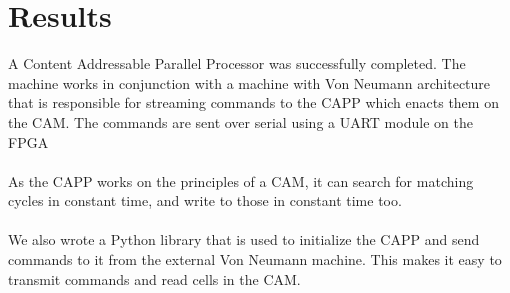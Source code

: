 \section{Results}
A Content Addressable Parallel Processor was successfully completed. 
The machine works in conjunction with a machine with Von Neumann architecture that is 
responsible for streaming commands to the CAPP which enacts them on the CAM. 
The commands are sent over serial using a UART module on the FPGA\\\\
As the CAPP works on the principles of a CAM, 
it can search for matching cycles in constant time, 
and write to those in constant time too. 
\\\\
We also wrote a Python library that is used to initialize the CAPP and send commands to it 
from the external Von Neumann machine. 
This makes it easy to transmit commands and read cells in the CAM. 